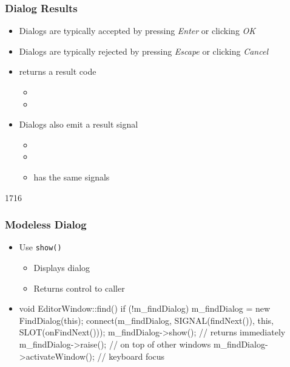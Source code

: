\begin{slide}
\frametitle{Dialog Results}
  \begin{itemize}
  \item Dialogs are typically accepted by pressing \textit{Enter} or clicking \textit{OK}
  \item Dialogs are typically rejected by pressing \textit{Escape} or clicking \textit{Cancel}
  \item {} returns a result code
    \begin{itemize}
    \item {}
    \item {}
    \end{itemize}
  \item Dialogs also emit a result signal
    \begin{itemize}
    \item {}
    \item {}
    \item {} has the same signals
    \end{itemize}
  \end{itemize}
\end{slide}


\begin{slide}[fragile]{1716}
\frametitle{Modeless Dialog}
  \begin{itemize}
 \item Use \texttt{show()}
    \begin{itemize}
    \item Displays dialog
    \item Returns control to caller
    \end{itemize}
  \item[]
    \begin{cpp}
void EditorWindow::find() {
  if (!m_findDialog) {
    m_findDialog = new FindDialog(this);
    connect(m_findDialog, SIGNAL(findNext()), 
      this, SLOT(onFindNext()));
  }
  m_findDialog->show(); // returns immediately
  m_findDialog->raise(); // on top of other windows
  m_findDialog->activateWindow(); // keyboard focus
}      
    \end{cpp}
  \end{itemize}
\end{slide}


